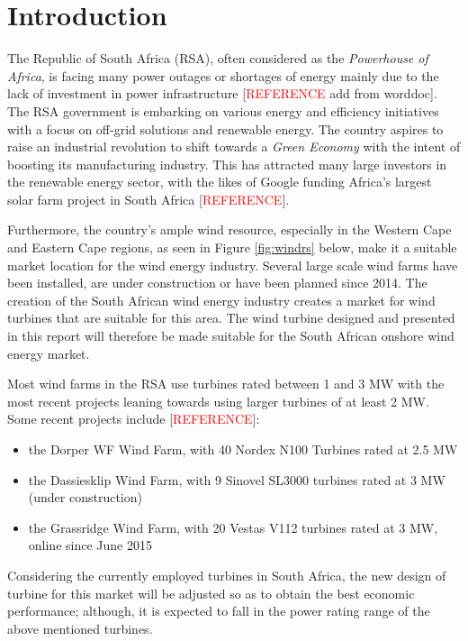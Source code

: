 \section{Introduction}

The Republic of South Africa (RSA), often considered as the \textit{Powerhouse of Africa}, is facing many power outages or shortages of energy mainly due to the lack of investment in power infrastructure [\textcolor{red}{REFERENCE} add from worddoc]. The RSA government is embarking on various energy and efficiency initiatives with a focus on off-grid solutions and renewable energy. The country aspires to raise an industrial revolution to shift towards a \textit{Green Economy} with the intent of boosting its manufacturing industry. This has attracted many large investors in the renewable energy sector, with the likes of Google funding Africa’s largest solar farm project in South Africa [\textcolor{red}{REFERENCE}].

Furthermore, the country’s ample wind resource, especially in the Western Cape and Eastern Cape regions, as seen in Figure \ref{fig:windrs} below, make it a suitable market location for the wind energy industry. Several large scale wind farms have been installed, are under construction or have been planned since 2014. The creation of the South African wind energy industry creates a market for wind turbines that are suitable for this area. The wind turbine designed and presented in this report will therefore be made suitable for the South African onshore wind energy market.

Most wind farms in the RSA use turbines rated between 1 and 3 MW with the most recent projects leaning towards using larger turbines of at least 2 MW. Some recent projects include [\textcolor{red}{REFERENCE}]:
\begin{itemize}
    \item the Dorper WF Wind Farm, with 40 Nordex N100 Turbines rated at 2.5 MW
    \item the Dassiesklip Wind Farm, with 9 Sinovel SL3000 turbines rated at 3 MW (under construction)
    \item the Grassridge Wind Farm, with 20 Vestas V112 turbines rated at 3 MW, online since June 2015
\end{itemize}

 Considering the currently employed turbines in South Africa, the new design of turbine for this market will be adjusted so as to obtain the best economic performance; although, it is expected to fall in the power rating range of the above mentioned turbines.

